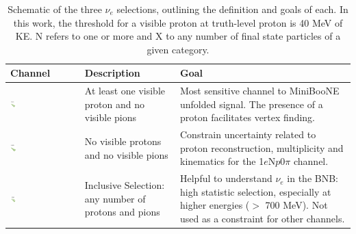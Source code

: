 \documentclass[a4paper]{article}
\begin{document}
\begin{table}[ht]
\caption{\label{tab:selectionsNue} Schematic of the three $\nu_e$ selections, outlining the definition and goals of each. In this work, the threshold for a visible proton at truth-level proton is 40 MeV of KE. N refers to one or more and X to any number of final state particles of a given category.}
\centering
\begin{tabular}{ m{} | m{}  m{}  }
Channel & Description & Goal \\
\hline
 \begin{center}\includegraphics[width=0.1\textwidth]{introduction/1eNp}\end{center}& At least one visible proton and no visible pions & Most sensitive channel to MiniBooNE unfolded signal. The presence of a proton facilitates vertex finding.\\
\hline
 \begin{center}\includegraphics[width=0.1\textwidth]{introduction/1e0p}\end{center}& No visible protons and no visible pions & Constrain uncertainty related to proton reconstruction, multiplicity and kinematics for the 1$e$N$p$0$\pi$ channel.\\
\hline
\begin{center}\includegraphics[width=0.1\textwidth]{introduction/inclusive} \end{center} & Inclusive Selection: any number of protons and pions & Helpful to understand $\nu_e$ in the BNB: high statistic selection, especially at higher energies ($>$ 700 MeV). Not used as a constraint for other channels. \\
\hline
\end{tabular}
\label{tab:gt}
\end{table}
\end{document}
